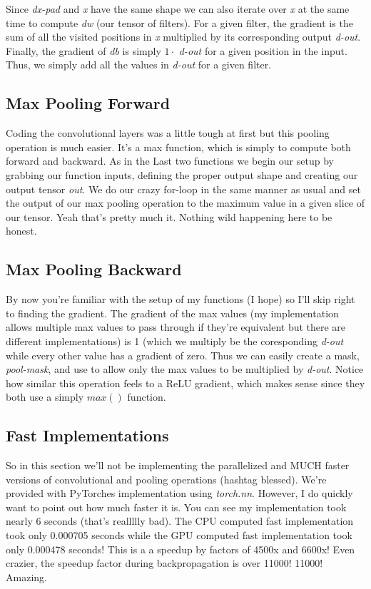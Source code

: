 \documentclass[12pt]{article}
\begin{document}
Since \emph{dx-pad} and \emph{x} have the same shape we can also iterate over \emph{x} at the same time
to compute \emph{dw} (our tensor of filters). For a given filter, the gradient is the sum of all the visited positions
in \emph{x} multiplied by its corresponding output \emph{d-out}. Finally, the gradient of \emph{db} is 
simply $1 \cdot$ \emph{d-out} for a given position in the input. Thus, we simply add all the values in 
\emph{d-out} for a given filter. 

\subsection{Max Pooling Forward}
Coding the convolutional layers was a little tough at first but this pooling operation is much 
easier. It's a max function, which is simply to compute both forward and backward. As in the Last
two functions we begin our setup by grabbing our function inputs, defining the proper output shape
and creating our output tensor \emph{out}. We do our crazy for-loop in the same manner as usual
and set the output of our max pooling operation to the maximum value in a given slice of our tensor. 
Yeah that's pretty much it. Nothing wild happening here to be honest. 

\subsection{Max Pooling Backward}
By now you're familiar with the setup of my functions (I hope) so I'll skip right to finding the 
gradient. The gradient of the max values (my implementation allows multiple max values to pass through 
if they're equivalent but there are different implementations) is 1 (which we multiply be the coresponding
\emph{d-out} while every other value has a gradient of zero. Thus we can easily create a mask, \emph{pool-mask},
and use to allow only the max values to be multiplied by \emph{d-out}. Notice how similar this operation feels
to a ReLU gradient, which makes sense since they both use a simply $max()$ function. 

\subsection{Fast Implementations}
So in this section we'll not be implementing the parallelized and MUCH faster versions of convolutional 
and pooling operations (hashtag blessed). We're provided with PyTorches implementation using \emph{torch.nn}. 
However, I do quickly want to point out how much faster it is. You can see my implementation took nearly 
6 seconds (that's reallllly bad). The CPU computed fast implementation took only 0.000705 seconds while 
the GPU computed fast implementation took only 0.000478 seconds! This is a a speedup by factors of 
4500x and 6600x! Even crazier, the speedup factor during backpropagation is over 11000! 11000! Amazing. 
\end{document}
